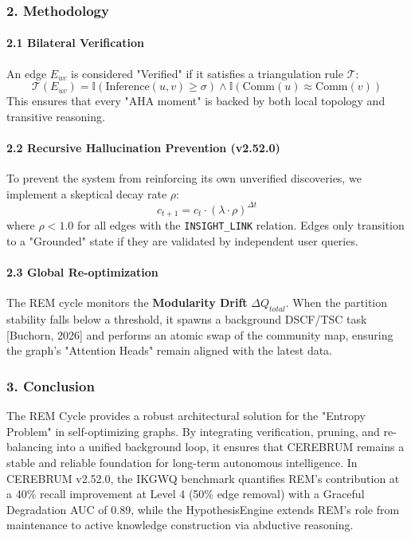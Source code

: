\subsubsection{2. Methodology}

\paragraph{2.1 Bilateral Verifi\-cation}
An edge $E_{uv}$ is considered "Verified" if it satisfies a trian\-gulation rule $\mathcal{T}$:
\begin{equation}
\mathcal{T}(E_{uv}) = \mathbb{I}(\text{Inference}(u,v) \geq \sigma) \land \mathbb{I}(\text{Comm}(u) \approx \text{Comm}(v))
\end{equation}
This ensures that every "AHA moment" is backed by both local topology and transitive reasoning.

\paragraph{2.2 Recursive Halluc\-ination Prevention (v2.52.0)}
To prevent the system from reinforcing its own unverified discoveries, we implement a skeptical decay rate $\rho$:
\begin{equation}
c_{t+1} = c_t \cdot (\lambda \cdot \rho)^{\Delta t}
\end{equation}
where $\rho < 1.0$ for all edges with the \texttt{INSIGHT\_LINK} relation. Edges only transition to a "Grounded" state if they are validated by independent user queries.

\paragraph{2.3 Global Re-optim\-ization}
The REM cycle monitors the \textbf{Modularity Drift} $\Delta Q_{total}$. When the partition stability falls below a threshold, it spawns a background DSCF/TSC task [Buchorn, 2026] and performs an atomic swap of the community map, ensuring the graph's "Attention Heads" remain aligned with the latest data.

\subsubsection{3. Conclusion}
The REM Cycle provides a robust archi\-tectural solution for the "Entropy Problem" in self-optimizing graphs. By integrating verif\-ication, pruning, and re-balancing into a unified background loop, it ensures that CEREBRUM remains a stable and reliable foundation for long-term autonomous intel\-ligence. In CEREBRUM v2.52.0, the IKGWQ benchmark quantifies REM's contr\-ibution at a 40\% recall improvement at Level 4 (50\% edge removal) with a Graceful Degradation AUC of 0.89, while the HypothesisEngine extends REM's role from maintenance to active knowledge const\-ruction via abductive reasoning.

